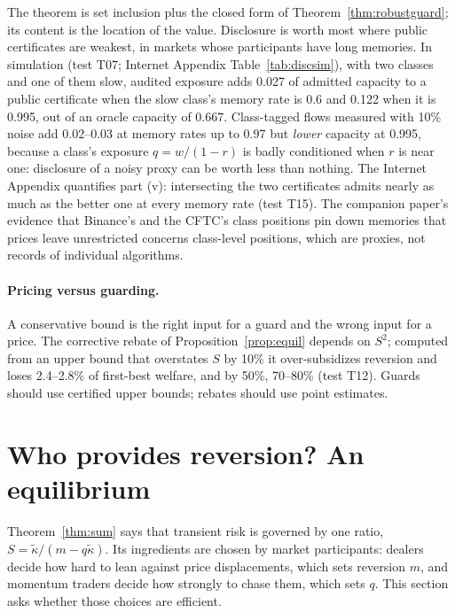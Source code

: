 \documentclass[12pt]{article}
\theoremstyle{definition}
\theoremstyle{remark}
\begin{document}
The theorem is set inclusion plus the closed form of Theorem~\ref{thm:robustguard}; its content is the location of the value. Disclosure is worth most where public certificates are weakest, in markets whose participants have long memories. In simulation (test T07; Internet Appendix Table~\ref{tab:discsim}), with two classes and one of them slow, audited exposure adds 0.027 of admitted capacity to a public certificate when the slow class's memory rate is 0.6 and 0.122 when it is 0.995, out of an oracle capacity of 0.667. Class-tagged flows measured with 10\% noise add 0.02--0.03 at memory rates up to 0.97 but \emph{lower} capacity at 0.995, because a class's exposure $q=w/(1-r)$ is badly conditioned when $r$ is near one: disclosure of a noisy proxy can be worth less than nothing. The Internet Appendix quantifies part (v): intersecting the two certificates admits nearly as much as the better one at every memory rate (test T15). The companion paper's evidence that Binance's and the CFTC's class positions pin down memories that prices leave unrestricted concerns class-level positions, which are proxies, not records of individual algorithms.



\paragraph{Pricing versus guarding.} A conservative bound is the right input for a guard and the wrong input for a price. The corrective rebate of Proposition~\ref{prop:equil} depends on $S^2$; computed from an upper bound that overstates $S$ by 10\% it over-subsidizes reversion and loses 2.4--2.8\% of first-best welfare, and by 50\%, 70--80\% (test T12). Guards should use certified upper bounds; rebates should use point estimates.
\section{Who provides reversion? An equilibrium}\label{sec:equil}

Theorem~\ref{thm:sum} says that transient risk is governed by one ratio, $S=\tilde\kappa/(m-q\tilde\kappa)$. Its ingredients are chosen by market participants: dealers decide how hard to lean against price displacements, which sets reversion $m$, and momentum traders decide how strongly to chase them, which sets $q$. This section asks whether those choices are efficient.
\end{document}
